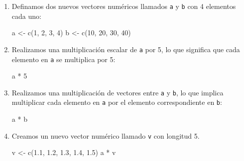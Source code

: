 \documentclass[
  jou,
  floatsintext,
  longtable,
  a4paper,
  nolmodern,
  notxfonts,
  notimes,
  12pt,
  colorlinks=true,linkcolor=blue,citecolor=blue,urlcolor=blue]{apa7}
\newenvironment{Shaded}{\begin{snugshade}}{\end{snugshade}}
\newcommand{\DecValTok}[1]{\textcolor[rgb]{0.68,0.00,0.00}{#1}}
\newcommand{\FloatTok}[1]{\textcolor[rgb]{0.68,0.00,0.00}{#1}}
\newcommand{\FunctionTok}[1]{\textcolor[rgb]{0.28,0.35,0.67}{#1}}
\newcommand{\NormalTok}[1]{\textcolor[rgb]{0.00,0.23,0.31}{#1}}
\newcommand{\OtherTok}[1]{\textcolor[rgb]{0.00,0.23,0.31}{#1}}
\newcommand{\SpecialCharTok}[1]{\textcolor[rgb]{0.37,0.37,0.37}{#1}}
\begin{document}
\begin{enumerate}
\def\labelenumi{\arabic{enumi}.}
\item
  Definamos dos nuevos vectores numéricos llamados \texttt{a} y
  \texttt{b} con 4 elementos cada uno:

\begin{Shaded}
\begin{Highlighting}[]
\NormalTok{a }\OtherTok{\textless{}{-}} \FunctionTok{c}\NormalTok{(}\DecValTok{1}\NormalTok{, }\DecValTok{2}\NormalTok{, }\DecValTok{3}\NormalTok{, }\DecValTok{4}\NormalTok{)}
\NormalTok{b }\OtherTok{\textless{}{-}} \FunctionTok{c}\NormalTok{(}\DecValTok{10}\NormalTok{, }\DecValTok{20}\NormalTok{, }\DecValTok{30}\NormalTok{, }\DecValTok{40}\NormalTok{)}
\end{Highlighting}
\end{Shaded}
\item
  Realizamos una multiplicación escalar de \texttt{a} por 5, lo que
  significa que cada elemento en \texttt{a} se multiplica por 5:

\begin{Shaded}
\begin{Highlighting}[]
\NormalTok{a }\SpecialCharTok{*} \DecValTok{5}
\end{Highlighting}
\end{Shaded}
\item
  Realizamos una multiplicación de vectores entre \texttt{a} y
  \texttt{b}, lo que implica multiplicar cada elemento en \texttt{a} por
  el elemento correspondiente en \texttt{b}:

\begin{Shaded}
\begin{Highlighting}[]
\NormalTok{a }\SpecialCharTok{*}\NormalTok{ b}
\end{Highlighting}
\end{Shaded}
\item
  Creamos un nuevo vector numérico llamado \texttt{v} con longitud 5.

\begin{Shaded}
\begin{Highlighting}[]
\NormalTok{v }\OtherTok{\textless{}{-}} \FunctionTok{c}\NormalTok{(}\FloatTok{1.1}\NormalTok{, }\FloatTok{1.2}\NormalTok{, }\FloatTok{1.3}\NormalTok{, }\FloatTok{1.4}\NormalTok{, }\FloatTok{1.5}\NormalTok{)}
\NormalTok{a }\SpecialCharTok{*}\NormalTok{ v}
\end{Highlighting}
\end{Shaded}
\end{enumerate}
\end{document}
